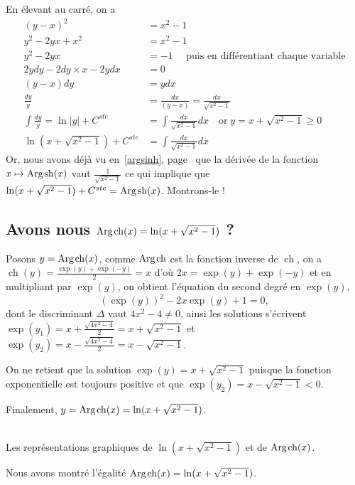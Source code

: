 \documentclass[a4paper,12pt]{report}
\renewcommand{\sinh}{\mathop{\mathrm{sh}}}
\renewcommand{\cosh}{\mathop{\mathrm{ch}}}
\renewcommand{\arg}{\mathop{\mathrm{Arg}}}
\begin{document}
En élevant au carré, on a 
\begin{align*}
(y-x)^2 & = x^2 - 1 \\
y^2 - 2yx + x^2 & = x^2 - 1 \\
y^2 - 2yx  & = -1 \quad \textrm{ puis en différentiant chaque variable} \\
2ydy - 2dy \times x - 2ydx & = 0 \\
(y-x)dy & = ydx \\
\frac{dy}{y} & = \frac{dx}{(y-x)} = \frac{dx}{\sqrt{x^2 - 1} } \\
\int \frac{dy}{y} = \ln|y| + C^{ste} & = \int \frac{dx}{\sqrt{x^2 - 1} } dx \quad \textrm{or} \; y = x + \sqrt{x^2 - 1}  \geqslant 0 \\
\ln(x + \sqrt{x^2 - 1}) + C^{ste} & = \int \frac{dx}{\sqrt{x^2 - 1} } dx  
\end{align*}
Or, nous avons déjà vu en~\ref{argsinh}, page~\pageref{argsinh} que la dérivée de la fonction  $x \mapsto \arg\mspace{-1mu}\sinh(x)$  vaut $ \frac{1}{ \sqrt{x^2 - 1}}$ ce qui implique que $\ln(x + \sqrt{x^2 - 1}) + C^{ste} = \arg\mspace{-1mu}\sinh\nolimits(x) $. Montrons-le !










\subsection{Avons nous $\arg\mspace{-1mu}\cosh\nolimits(x) = \ln(x + \sqrt{x^2 - 1}) $ ?}

Posons $ y = \arg\mspace{-1mu}\cosh\nolimits(x) $, comme $ \arg\mspace{-1mu}\cosh\nolimits $ est la fonction inverse de $\cosh$, on a $\cosh(y) = \frac{\exp(y) + \exp(-y)}{2} = x$ d'où $2x = \exp(y) + \exp(-y) $ et en multipliant par $\exp(y)$, on obtient l'équation du second degré en $\exp(y)$,
\begin{equation}
\left(\exp(y) \right)^2 - 2x \exp(y) + 1 = 0, 
\end{equation}
dont le discriminant $\Delta$ vaut $4x^2 - 4 \neq 0$, ainsi les solutions s'écrivent $ \exp(y_1) = x + \frac{\sqrt{4x^2 - 4}}{2} = x + \sqrt{x^2-1}$ et $ \exp(y_2) = x - \frac{\sqrt{4x^2 - 4}}{2} = x - \sqrt{x^2-1}$. 

On ne retient que la solution $ \exp(y) = x + \sqrt{x^2-1}$ puisque la fonction exponentielle est toujours positive et que $ \exp(y_2) = x - \sqrt{x^2-1} < 0 $.

Finalement, $y = \arg\mspace{-1mu}\cosh\nolimits(x) = \ln(x + \sqrt{x^2-1})$.


\begin{center}
 \\
Les représentations graphiques de $\ln(x + \sqrt{x^2-1})$ et de $\arg\mspace{-1mu}\cosh\nolimits(x)$.
\end{center}


Nous avons montré l'égalité $\arg\mspace{-1mu}\cosh\nolimits(x) = \ln(x + \sqrt{x^2-1}) $.
\end{document}
